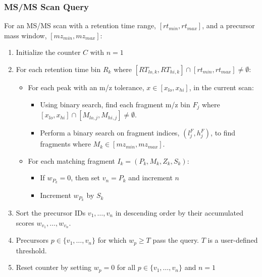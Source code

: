 \documentclass[pdflatex,sn-nature]{sn-jnl}
\begin{document}
\subsubsection{MS/MS Scan Query}\label{subsubsec:msms-scan-query}
For an MS/MS scan with a retention time range, $[rt_{min}, rt_{max}]$, and a precursor mass window, $[mz_{min}, mz_{max}]$:
\begin{enumerate}
\item Initialize the counter $C$ with $n=1$
\item For each retention time bin $R_k$ where $[RT_{lo,k}, RT_{hi,k}] \cap [rt_{min}, rt_{max}] \neq \emptyset$:
    \begin{itemize}
        \item For each peak with an m/z tolerance, $x \in [x_{lo}, x_{hi}]$, in the current scan:
            \begin{itemize}
                \item Using binary search, find each fragment m/z bin $F_j$ where $[x_{lo}, x_{hi}] \cap [M_{lo,j}, M_{hi,j}] \neq \emptyset$.
                \item Perform a binary search on fragment indices, $(l_j^F, h_j^F)$, to find fragments where $M_k \in [mz_{min}, mz_{max}]$.
            \end{itemize}
        \item For each matching fragment $I_k = (P_k, M_k, Z_k, S_k)$:
            \begin{itemize}
                \item If $w_{P_k} = 0$, then set $v_n = P_k$ and increment $n$
                \item Increment $w_{P_k}$ by $S_k$
            \end{itemize}
    \end{itemize}

\item Sort the precursor IDs $v_1, \ldots, v_n$ in descending order by their accumulated scores $w_{v_1}, \ldots, w_{v_n}$.

\item Precursors $p \in \{v_1,\ldots,v_n\}$ for which $w_p \geq T$ pass the query. $T$ is a user-defined threshold. 

\item Reset counter by setting $w_p = 0$ for all $p \in \{v_1,\ldots,v_n\}$ and $n=1$
\end{enumerate}
\end{document}
